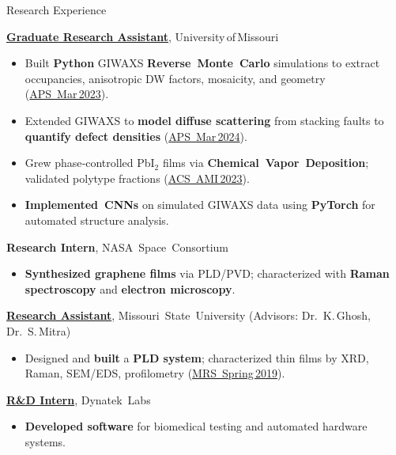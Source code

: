 \begin{rubric}{Research Experience}

  \entry*[2021--Present]%
  \textbf{\href{https://physics.missouri.edu/news/celebrating-student-awards-scholarships-and-recognition}{Graduate Research Assistant}}, University of Missouri%
  \begin{itemize}
    \item Built \textbf{Python} GIWAXS \textbf{Reverse Monte Carlo} simulations to extract occupancies, anisotropic DW factors, mosaicity, and geometry (\href{https://www.researchgate.net/publication/377264935_Quantifying_Orientational_Order_of_PbI2_van_der_Waals_Films_with_X-ray_Diffraction_using_an_Area_Detector}{APS Mar 2023}).
    \item Extended GIWAXS to \textbf{model diffuse scattering} from stacking faults to \textbf{quantify defect densities} (\href{https://meetings.aps.org/Meeting/MAR24/Session/S64.3}{APS Mar 2024}).
    \item Grew phase‑controlled PbI$_2$ films via \textbf{Chemical Vapor Deposition}; validated polytype fractions (\href{https://doi.org/10.1021/acsami.3c14559}{ACS AMI 2023}).
    \item \textbf{Implemented CNNs} on simulated GIWAXS data using \textbf{PyTorch} for automated structure analysis.
  \end{itemize}

  \entry*[2019--2020]%
  \textbf{Research Intern}, NASA Space Consortium%
  \begin{itemize}
    \item \textbf{Synthesized graphene films} via PLD/PVD; characterized with \textbf{Raman spectroscopy} and \textbf{electron microscopy}.
  \end{itemize}

  \entry*[2017--2020]%
  \textbf{\href{https://www.mrs.org/meetings-events/annual-meetings/archive/profile/David-Beckwitt-}{Research Assistant}}, Missouri State University (Advisors: Dr. K. Ghosh, Dr. S. Mitra)%
  \begin{itemize}
    \item Designed and \textbf{built} a \textbf{PLD system}; characterized thin films by XRD, Raman, SEM/EDS, profilometry (\href{https://www.mrs.org/meetings-events/annual-meetings/archive/profile/David-Beckwitt-}{MRS Spring 2019}).
  \end{itemize}

  \entry*[2019]%
  \textbf{\href{https://dynateklabs.com}{R\&D Intern}}, Dynatek Labs%
  \begin{itemize}
    \item \textbf{Developed software} for biomedical testing and automated hardware systems.
  \end{itemize}

\end{rubric}
